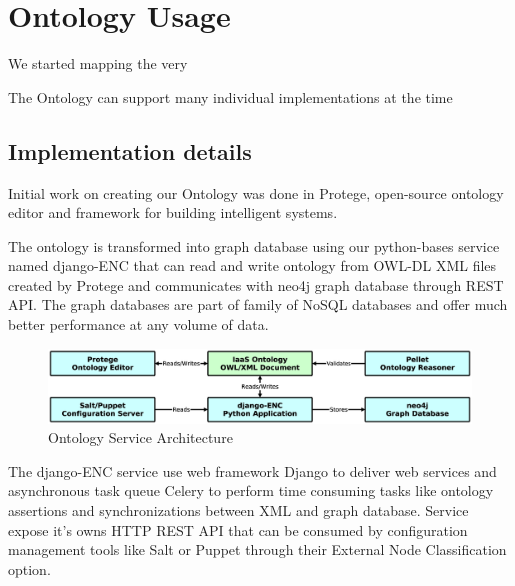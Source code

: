 
\section{Ontology Usage}


We started mapping the very


The Ontology can support many individual implementations at the time

% 

\subsection{Implementation details}


Initial work on creating our Ontology was done in Protege, open-source ontology editor and framework for building intelligent systems.

The ontology is transformed into graph database using our python-bases service named django-ENC that can read and write ontology from OWL-DL XML files created by Protege and communicates with neo4j graph database through REST API. The graph databases are part of family of NoSQL databases and offer much better performance at any volume of data.

\begin{figure}[!h]
\centering
\includegraphics[scale=.17]{img/django_enc_arch.eps}
\caption{Ontology Service Architecture}
\label{fig:cm}
\end{figure}

The django-ENC service  use  web framework Django to deliver web services and asynchronous task queue Celery to perform time consuming tasks like ontology assertions and synchronizations between XML and graph database. Service expose it's owns HTTP REST API that can be consumed by configuration management tools like Salt or Puppet through their External Node Classification option.

